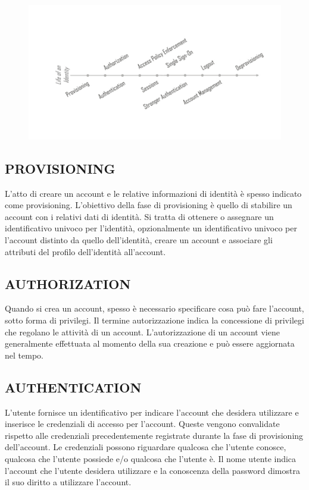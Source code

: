 \begin{figure}[H]
    \centering
    \includegraphics[width=\textwidth, keepaspectratio]{capitoli/id_managing/imgs/idman1.jpg}
\end{figure}

\subsection{PROVISIONING}

L'atto di creare un account e le relative informazioni di identità è spesso
indicato come provisioning.
L'obiettivo della fase di provisioning è quello di stabilire un account con i
relativi dati di identità.
Si tratta di ottenere o assegnare un identificativo univoco per l'identità,
opzionalmente un identificativo univoco per l'account distinto da quello
dell'identità, creare un account e associare gli attributi del profilo
dell'identità all'account.

\subsection{AUTHORIZATION}

Quando si crea un account, spesso è necessario specificare cosa può fare l'account,
sotto forma di privilegi.
Il termine autorizzazione indica la concessione di privilegi che regolano le attività
di un account.
L'autorizzazione di un account viene generalmente effettuata al momento della sua
creazione e può essere aggiornata nel tempo.

\subsection{AUTHENTICATION}

L'utente fornisce un identificativo per indicare l'account che desidera utilizzare e
inserisce le credenziali di accesso per l'account.
Queste vengono convalidate rispetto alle credenziali precedentemente registrate
durante la fase di provisioning dell'account.
Le credenziali possono riguardare qualcosa che l'utente conosce, qualcosa che
l'utente possiede e/o qualcosa che l'utente è.
Il nome utente indica l'account che l'utente desidera utilizzare e la conoscenza
della password dimostra il suo diritto a utilizzare l'account.

